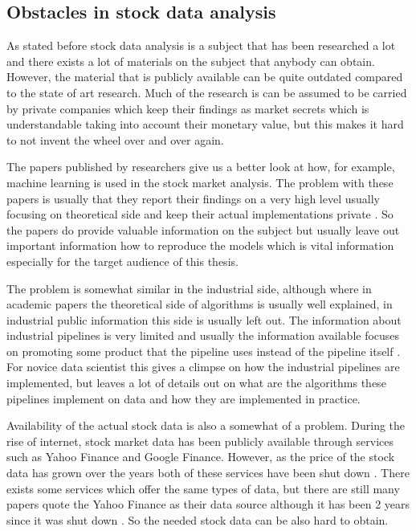 \subsection{Obstacles in stock data analysis}

As stated before stock data analysis is a subject that has been researched a lot and there exists a lot of materials on the subject that anybody can obtain.
However, the material that is publicly available can be quite outdated compared to the state of art research.
Much of the research is can be assumed to be carried by private companies which keep their findings as market secrets which is understandable taking into account their monetary value, but this makes it hard to not invent the wheel over and over again.

The papers published by researchers give us a better look at how, for example, machine learning is used in the stock market analysis.
The problem with these papers is usually that they report their findings on a very high level usually focusing on theoretical side and keep their actual implementations private \cite{le} \cite{adresic} \cite{islam}.
So the papers do provide valuable information on the subject but usually leave out important information how to reproduce the models which is vital information especially for the target audience of this thesis.

The problem is somewhat similar in the industrial side, although where in academic papers the theoretical side of algorithms is usually well explained, in industrial public information this side is usually left out.
The information about industrial pipelines is very limited and usually the information available focuses on promoting some product that the pipeline uses instead of the pipeline itself \cite{palmer} \cite{snively}.
For novice data scientist this gives a climpse on how the industrial pipelines are implemented, but leaves a lot of details out on what are the algorithms these pipelines implement on data and how they are implemented in practice.

Availability of the actual stock data is also a somewhat of a problem.
During the rise of internet, stock market data has been publicly available through services such as Yahoo Finance and Google Finance.
However, as the price of the stock data has grown over the years both of these services have been shut down \cite{lotter}.
There exists some services which offer the same types of data, but there are still many papers quote the Yahoo Finance as their data source although it has been 2 years since it was shut down \cite{serez2} \cite{le}.
So the needed stock data can be also hard to obtain.

